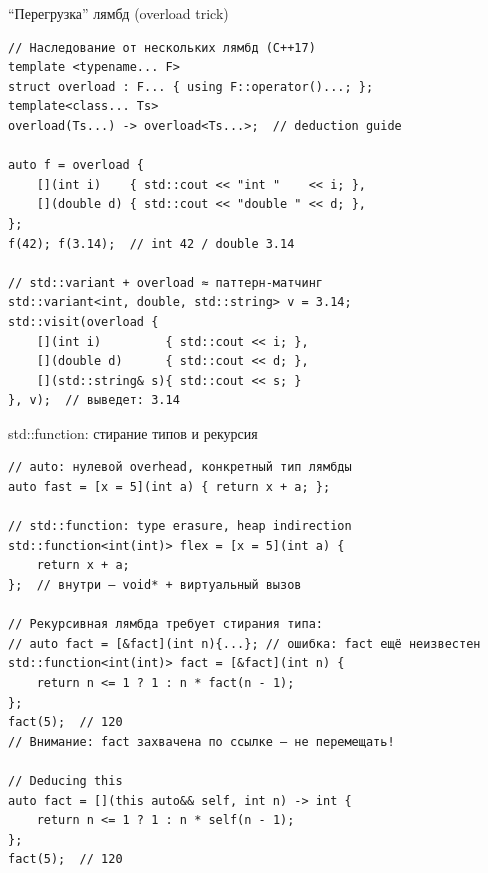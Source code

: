 \documentclass{beamer}
\begin{document}
\begin{frame}[fragile]{``Перегрузка'' лямбд (overload trick)}
\begin{lstlisting}
// Наследование от нескольких лямбд (C++17)
template <typename... F>
struct overload : F... { using F::operator()...; };
template<class... Ts>
overload(Ts...) -> overload<Ts...>;  // deduction guide

auto f = overload {
    [](int i)    { std::cout << "int "    << i; },
    [](double d) { std::cout << "double " << d; },
};
f(42); f(3.14);  // int 42 / double 3.14

// std::variant + overload ≈ паттерн-матчинг
std::variant<int, double, std::string> v = 3.14;
std::visit(overload {
    [](int i)         { std::cout << i; },
    [](double d)      { std::cout << d; },
    [](std::string& s){ std::cout << s; }
}, v);  // выведет: 3.14
\end{lstlisting}
\end{frame}

\begin{frame}[fragile]{std::function: стирание типов и рекурсия}
\begin{lstlisting}
// auto: нулевой overhead, конкретный тип лямбды
auto fast = [x = 5](int a) { return x + a; };

// std::function: type erasure, heap indirection
std::function<int(int)> flex = [x = 5](int a) {
    return x + a;
};  // внутри — void* + виртуальный вызов

// Рекурсивная лямбда требует стирания типа:
// auto fact = [&fact](int n){...}; // ошибка: fact ещё неизвестен
std::function<int(int)> fact = [&fact](int n) {
    return n <= 1 ? 1 : n * fact(n - 1);
};
fact(5);  // 120
// Внимание: fact захвачена по ссылке — не перемещать!

// Deducing this
auto fact = [](this auto&& self, int n) -> int {
    return n <= 1 ? 1 : n * self(n - 1);
};
fact(5);  // 120

\end{lstlisting}
\end{frame}
\end{document}
